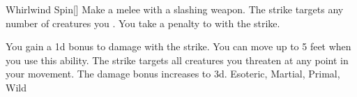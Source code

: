 \lowercase{\hypertarget{maneuver:Whirlwind Spin}{}}\label{maneuver:Whirlwind Spin}
\hypertarget{maneuver:Whirlwind Spin}{}
\begin{freeability}{Whirlwind Spin}[]
Make a melee  with a slashing weapon.
The strike targets any number of creatures you .
You take a  penalty to  with the strike.

\rankline
{} You gain a \plus1d bonus to damage with the strike.
 You can move up to 5 feet when you use this ability.
The strike targets all creatures you threaten at any point in your movement.
 The damage bonus increases to \plus3d.
 Esoteric, Martial, Primal, Wild
\end{freeability}
\vspace{0.25em}

